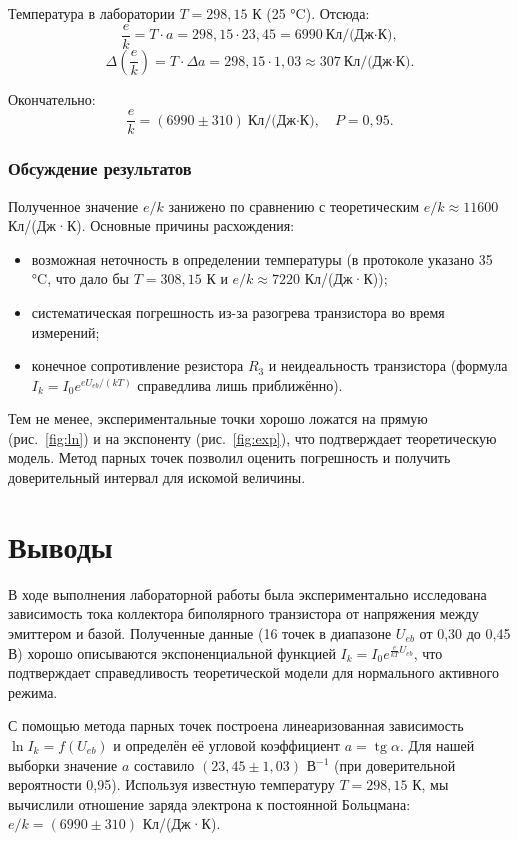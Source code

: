 Температура в лаборатории \(T = 298{,}15\) К (25 °C). Отсюда:
\[
\frac{e}{k} = T \cdot a = 298{,}15 \cdot 23{,}45 = 6990\ \text{Кл/(Дж·К)},
\]
\[
\Delta\left(\frac{e}{k}\right) = T \cdot \Delta a = 298{,}15 \cdot 1{,}03 \approx 307\ \text{Кл/(Дж·К)}.
\]

Окончательно:
\[
\frac{e}{k} = (6990 \pm 310)\ \text{Кл/(Дж·К)},\quad P = 0{,}95.
\]

\subsubsection{Обсуждение результатов}

Полученное значение \(e/k\) занижено по сравнению с теоретическим \(e/k \approx 11600\) Кл/(Дж·К). Основные причины расхождения:
\begin{itemize}
    \item возможная неточность в определении температуры (в протоколе указано 35 °C, что дало бы \(T = 308{,}15\) К и \(e/k \approx 7220\) Кл/(Дж·К));
    \item систематическая погрешность из-за разогрева транзистора во время измерений;
    \item конечное сопротивление резистора \(R_3\) и неидеальность транзистора (формула \(I_k = I_0 e^{eU_{eb}/(kT)}\) справедлива лишь приближённо).
\end{itemize}
Тем не менее, экспериментальные точки хорошо ложатся на прямую (рис.~\ref{fig:ln}) и на экспоненту (рис.~\ref{fig:exp}), что подтверждает теоретическую модель. Метод парных точек позволил оценить погрешность и получить доверительный интервал для искомой величины.

\section{Выводы}

В ходе выполнения лабораторной работы была экспериментально исследована зависимость тока коллектора биполярного транзистора от напряжения между эмиттером и базой. Полученные данные (16 точек в диапазоне \(U_{eb}\) от 0,30 до 0,45 В) хорошо описываются экспоненциальной функцией \(I_k = I_0 e^{\frac{e}{kT}U_{eb}}\), что подтверждает справедливость теоретической модели для нормального активного режима.

С помощью метода парных точек построена линеаризованная зависимость \(\ln I_k = f(U_{eb})\) и определён её угловой коэффициент \(a = \operatorname{tg}\alpha\). Для нашей выборки значение \(a\) составило \((23{,}45 \pm 1{,}03)\) В\(^{-1}\) (при доверительной вероятности 0,95). Используя известную температуру \(T = 298{,}15\) К, мы вычислили отношение заряда электрона к постоянной Больцмана: \(e/k = (6990 \pm 310)\) Кл/(Дж·К).

